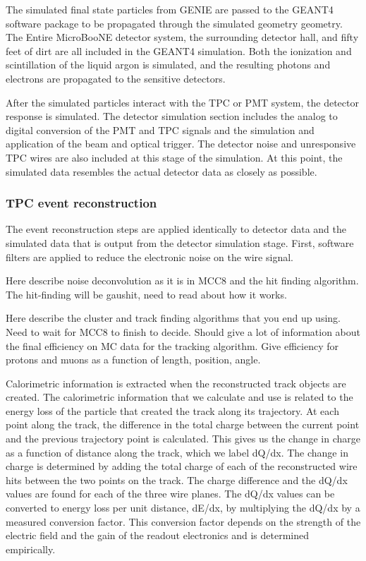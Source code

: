    The simulated final state particles from GENIE are passed to the
    GEANT4~\cite{geant4} software package to be propagated through the
    simulated geometry geometry. The Entire MicroBooNE detector system, the
    surrounding detector hall, and fifty feet of dirt are all included in the
    GEANT4 simulation. Both the ionization and scintillation of the liquid
    argon is simulated, and the resulting photons and electrons are propagated
    to the sensitive detectors.

    After the simulated particles interact with the TPC or PMT system, the
    detector response is simulated. The detector simulation section includes
    the analog to digital conversion of the PMT and TPC signals and the
    simulation and application of the beam and optical trigger. The detector
    noise and unresponsive TPC wires are also included at this stage of the
    simulation. At this point, the simulated data resembles the actual detector
    data as closely as possible.

  \subsubsection{TPC event reconstruction}
    The event reconstruction steps are applied identically to detector data and
    the simulated data that is output from the detector simulation stage.
    First, software filters are applied to reduce the electronic noise on the
    wire signal.

    Here describe noise deconvolution as it is in MCC8 and the hit finding
    algorithm. The hit-finding will be gaushit, need to read about how it
    works.

    Here describe the cluster and track finding algorithms that you end up
    using. Need to wait for MCC8 to finish to decide. Should give a lot of
    information about the final efficiency on MC data for the tracking
    algorithm. Give efficiency for protons and muons as a function of length,
    position, angle.

    Calorimetric information is extracted when the reconstructed track objects
    are created. The calorimetric information that we calculate and use is
    related to the energy loss of the particle that created the track along its
    trajectory. At each point along the track, the difference in the total
    charge between the current point and the previous trajectory point is
    calculated. This gives us the change in charge as a function of distance
    along the track, which we label dQ/dx. The change in charge is determined
    by adding the total charge of each of the reconstructed wire hits between
    the two points on the track. The charge difference and the dQ/dx values are
    found for each of the three wire planes. The dQ/dx values can be converted
    to energy loss per unit distance, dE/dx, by multiplying the dQ/dx by a
    measured conversion factor. This conversion factor depends on the strength
    of the electric field and the gain of the readout electronics and is
    determined empirically. 

